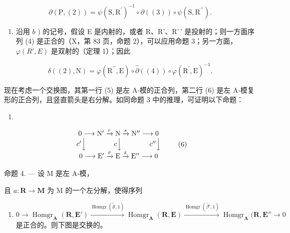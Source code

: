 \[
\partial (\mathrm{P}, (2)) = \psi (\mathrm{S}, \mathrm{R} ^ {\prime}) ^ {- 1} \circ \partial ((3)) \circ \psi (\mathrm{S}, \mathrm{R} ^ {\prime \prime}).
\]

\begin{enumerate}
\def\labelenumi{\arabic{enumi})}
\setcounter{enumi}{2}
\tightlist
\item
  沿用 \(b\) ) 的记号，假设 E 是内射的，或者 R、R'、R'\,' 是投射的；则一方面序列 (4) 是正合的（X，第 83 页，命题 2），可以应用命题 3；另一方面， \(\varphi(R', E)\) 是双射的（定理 1）；因此
\end{enumerate}

\[
\delta ((2), \mathrm{N}) = \varphi (\mathrm{R} ^ {\prime \prime}, \mathrm{E}) \circ \hat {\partial} ((4)) \circ \varphi (\mathrm{R} ^ {\prime}, \mathrm{E}) ^ {- 1}.
\]

现在考虑一个交换图，其第一行 (5) 是左 A-模的正合列，第二行 (6) 是左 A-模复形的正合列，且竖直箭头是右分解。如同命题 3 中的推理，可证明以下命题：

\begin{enumerate}
\def\labelenumi{(\arabic{enumi})}
\setcounter{enumi}{4}
\tightlist
\item
\end{enumerate}

\[
\begin{array}{c} 0 \longrightarrow \mathrm{N} ^ {\prime} \xrightarrow {r} \mathrm{N} \xrightarrow {s} \mathrm{N} ^ {\prime \prime} \longrightarrow 0 \\ c ^ {\prime} \Big \downarrow \qquad \qquad c \Big \downarrow \qquad \qquad c ^ {\prime \prime} \Big \downarrow \\ 0 \longrightarrow \mathrm{E} ^ {\prime} \xrightarrow {\tilde {r}} \mathrm{E} \xrightarrow {\tilde {s}} \mathrm{E} ^ {\prime \prime} \longrightarrow 0 \end{array}\tag{6}
\]

命题 4. --- 设 M 是左 A-模，

且 \(a: \mathbf{R} \to \mathbf{M}\) 为 M 的一个左分解，使得序列

\begin{enumerate}
\def\labelenumi{(\arabic{enumi})}
\setcounter{enumi}{6}
\tightlist
\item
  \(0 \to \operatorname{Homgr}_{\mathbf{A}}(\mathbf{R}, \mathbf{E}') \xrightarrow{\operatorname{Homgr}(\tilde{\mathcal{S}}, 1)} \operatorname{Homgr}_{\mathbf{A}}(\mathbf{R}, \mathbf{E}) \xrightarrow{\operatorname{Homgr}(\tilde{\mathcal{F}}, 1)} \operatorname{Homgr}_{\mathbf{A}}(\mathbf{R}, \mathbf{E}'' \to 0\) 是正合的。则下图是交换的。
\end{enumerate}

